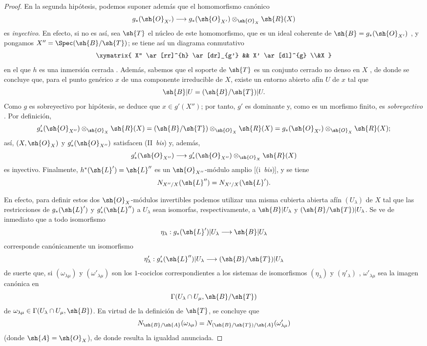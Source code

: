 \documentclass[oneside,10pt]{amsart}
\makeatletter
\newcommand{\ega@arrow}[2]{\mathchoice{#1}{#2}{#2}{#2}}
\renewcommand{\to}{\ega@arrow{\longrightarrow}{\rightarrow}}
\newcommand{\oldpage}[2][]{\marginnote{\normalfont\footnotesize\textbf{#1}~|~#2}\ignorespaces}
\makeatother
\begin{document}
\begin{proof}
En la segunda hipótesis, podemos suponer además que el homomorfismo canónico
\[
  g_*(\sh{O}_{X'})\to
  g_*(\sh{O}_{X'})\otimes_{\sh{O}_X}\sh{R}(X)
\]
es \emph{inyectivo}.
\oldpage[II]{131}
En efecto, si no es así, sea $\sh{T}$ el núcleo de este homomorfismo, que es un ideal coherente de $\sh{B}=g_*(\sh{O}_{X'})$ , y pongamos $X''=\Spec(\sh{B}/\sh{T})$;
se tiene así un diagrama conmutativo
\[
  \xymatrix{
    X'' \ar[rr]^{h} \ar[dr]_{g'}
    && X' \ar[dl]^{g}
  \\&X
  }
\]
en el que $h$ es una inmersión cerrada .
Además, sabemos que el soporte de $\sh{T}$ es un conjunto cerrado  no denso en $X$ , de donde se concluye que, para el punto genérico $x$ de una componente irreducible de $X$, existe un entorno abierto afín $U$ de $x$ tal que
\[
  \sh{B}|U=(\sh{B}/\sh{T})|U.
\]
Como $g$ es sobreyectivo por hipótesis, se deduce que $x\in g'(X'')$;
por tanto, $g'$ es dominante y, como es un morfismo finito, es \emph{sobreyectivo} .
Por definición,
\[
  g'_*(\sh{O}_{X''})\otimes_{\sh{O}_X}\sh{R}(X)
  =(\sh{B}/\sh{T})\otimes_{\sh{O}_X}\sh{R}(X)
  =g_*(\sh{O}_{X'})\otimes_{\sh{O}_X}\sh{R}(X);
\]
así, $(X,\sh{O}_X)$ y $g'_*(\sh{O}_{X''})$ satisfacen (II~\emph{bis}) y, además,
\[
  g'_*(\sh{O}_{X''})\to
  g'_*(\sh{O}_{X''})\otimes_{\sh{O}_X}\sh{R}(X)
\]
es inyectivo.
Finalmente, $h^*(\sh{L}')=\sh{L}''$ es un $\sh{O}_{X''}$-módulo amplio [(i~\emph{bis})], y se tiene
\[
  N_{X''/X}(\sh{L}'')=N_{X'/X}(\sh{L}').
\]

En efecto, para definir estos dos $\sh{O}_X$-módulos invertibles podemos utilizar una misma cubierta abierta afín $(U_\lambda)$ de $X$ tal que las restricciones de $g_*(\sh{L}')$ y $g'_*(\sh{L}'')$ a $U_\lambda$ sean isomorfas, respectivamente, a $\sh{B}|U_\lambda$ y $(\sh{B}/\sh{T})|U_\lambda$.
Se ve de inmediato que a todo isomorfismo
\[
  \eta_\lambda:g_*(\sh{L}')|U_\lambda\to\sh{B}|U_\lambda
\]
corresponde canónicamente un isomorfismo
\[
  \eta'_\lambda:g'_*(\sh{L}'')|U_\lambda\to
  (\sh{B}/\sh{T})|U_\lambda
\]
de suerte que, si $(\omega_{\lambda\mu})$ y $(\omega'_{\lambda\mu})$ son los $1$-cociclos correspondientes a los sistemas de isomorfismos $(\eta_\lambda)$ y $(\eta'_\lambda)$ , $\omega'_{\lambda\mu}$ sea la imagen canónica en
\[
  \Gamma(U_\lambda\cap U_\mu,\sh{B}/\sh{T})
\]
de $\omega_{\lambda\mu}\in\Gamma(U_\lambda\cap U_\mu,\sh{B})$.
En virtud de la definición de $\sh{T}$, se concluye que
\[
  N_{\sh{B}/\sh{A}}(\omega_{\lambda\mu})
  =
  N_{(\sh{B}/\sh{T})/\sh{A}}(\omega'_{\lambda\mu})
\]
(donde $\sh{A}=\sh{O}_X$), de donde resulta la igualdad anunciada.


\end{proof}
\end{document}
